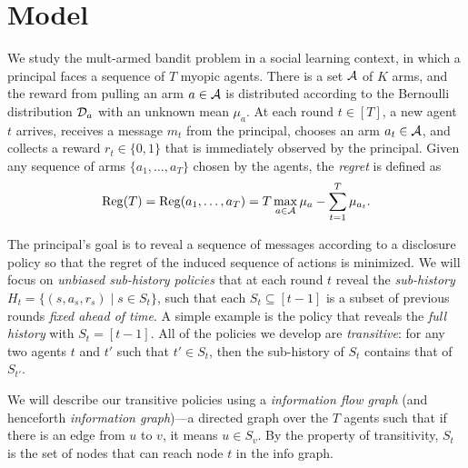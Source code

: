 \section{Model}
\label{sec:model}

We study the mult-armed bandit problem in a social learning context, in which a principal faces a sequence of $T$ myopic agents. There is a set $\mathcal{A}$ of $K$ arms, and the reward from pulling an arm $a\in \mathcal{A}$ is distributed according to the Bernoulli distribution $\mathcal{D}_a$ with an unknown mean $\mu_a$. At each round $t\in [T]$, a new agent $t$ arrives, receives a message $m_t$ from the principal, chooses an arm $a_t\in \mathcal{A}$, and collects a reward $r_t\in \{0,1\}$ that is immediately observed by the principal. Given any sequence of arms $\{a_1, \ldots, a_T\}$ chosen by the agents, the \emph{regret} is defined as
\[
  \mathrm{Reg}(T)= \mathrm{Reg}(a_1, \ldots , a_T) = T \max_{a\in \mathcal{A}} \mu_a -
  \sum_{t=1}^T \mu_{a_t}.
\]

 The principal's goal is to reveal a sequence of messages according to a disclosure policy so that the regret of the induced sequence of actions is minimized. We will focus on \emph{unbiased sub-history policies} that at each round $t$ reveal the \emph{sub-history} $H_t = \{(s, a_s, r_s)\mid s \in S_t\}$, such that each $S_t\subseteq [t-1]$ is a subset of previous rounds \emph{fixed ahead of time}. A simple example is the policy that reveals the \emph{full history} with $S_t = [t-1]$.  All of the policies we develop are \emph{transitive}: for any two agents $t$ and $t'$ such that $t'\in S_t$, then the sub-history of $S_t$ contains that of $S_{t'}$.

 We will describe our transitive policies using a \emph{information flow graph} (and henceforth \emph{information graph})---a directed graph over the $T$ agents such that if there is an edge from $u$ to $v$, it means $u\in S_v$. By the property of transitivity, $S_t$ is the set of nodes that can reach node $t$ in the info graph. 

\iffalse
\begin{itemize}
\item \textbf{Full history:} We show each agent the history of all previous agents' pulls. We call this policy \ALGG. 
\item \textbf{Unbiased sub-history:} We show each agent only a subset of history. The subsets are pre-determined before any arms are pulled.  
\item \textbf{Info graph:} All the recommendation policies in this paper can be described by an undirected transitive graph with $T$ nodes. We call it the info graph. The $T$ nodes in the graph represent the $T$ agents. If there is an edge between node $u$ and $v$ for $u < v$, it means the history of agent $u$ is shown to agent $v$.
\end{itemize}
\fi

